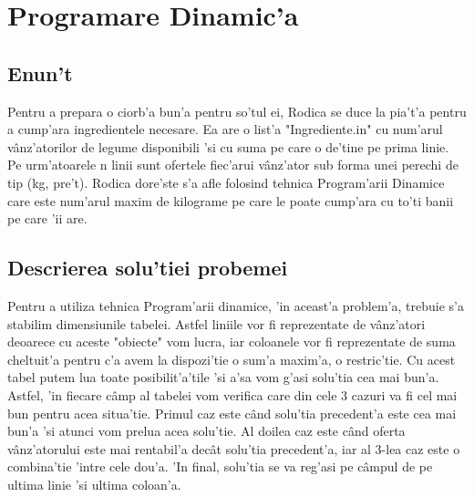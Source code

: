 \chapter{Programare Dinamic'a}
\section{Enun't}
\vspace{5mm}
\myindent
Pentru a prepara o ciorb'a bun'a pentru so'tul ei, Rodica se duce la pia't'a pentru a cump'ara ingredientele necesare. Ea are o list'a "Ingrediente.in" cu num'arul v\^anz'atorilor de legume disponibili 'si cu suma pe care o de'tine pe prima linie. Pe urm'atoarele n linii sunt ofertele fiec'arui v\^anz'ator sub forma unei perechi de tip (kg, pre't). Rodica dore'ste s'a afle folosind tehnica Program'arii Dinamice care este num'arul maxim de kilograme pe care le poate cump'ara cu to'ti banii pe care 'ii are.

\vspace{10mm}
\section{Descrierea solu'tiei probemei}
\myindent
Pentru a utiliza tehnica Program'arii dinamice, 'in aceast'a problem'a, trebuie s'a stabilim dimensiunile tabelei. Astfel liniile vor fi reprezentate de v\^anz'atori deoarece cu aceste "obiecte" vom lucra, iar coloanele vor fi reprezentate de suma cheltuit'a pentru c'a avem la dispozi'tie o sum'a maxim'a, o restric'tie. Cu acest tabel putem lua toate posibilit'a'tile 'si a'sa vom g'asi solu'tia cea mai bun'a. Astfel, 'in fiecare c\^amp al tabelei vom verifica care din cele 3 cazuri va fi cel mai bun pentru acea situa'tie. Primul caz este c\^and solu'tia precedent'a este cea mai bun'a 'si atunci vom prelua acea solu'tie. Al doilea caz este c\^and oferta v\^anz'atorului este mai rentabil'a dec\^at solu'tia precedent'a, iar al 3-lea caz este o combina'tie 'intre cele dou'a. 'In final, solu'tia se va reg'asi pe c\^ampul de pe ultima linie 'si ultima coloan'a.

\vspace{10mm}
